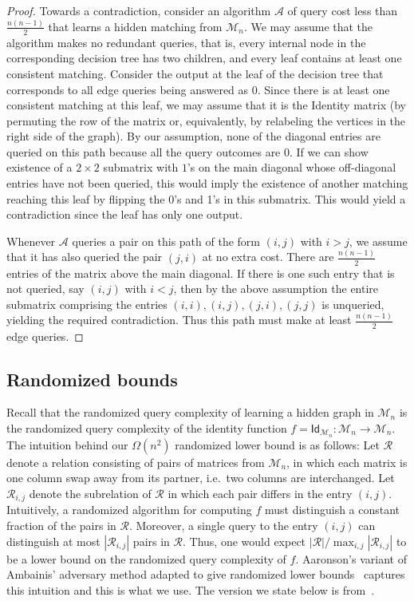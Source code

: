 \documentclass[11pt]{article}
\newcommand{\cA}{\mathcal{A}}
\newcommand{\cM}{\mathcal{M}}
\newcommand{\cR}{\mathcal{R}}
\begin{document}
\begin{proof}
    Towards a contradiction, consider an algorithm $\cA$ of query cost less than $\frac{n(n-1)}{2}$ that learns a hidden matching from $\cM_n$. We may assume that the algorithm makes no redundant queries, that is, every internal node in the corresponding decision tree has two children, and every leaf contains at least one consistent matching. Consider the output at the leaf of the decision tree that corresponds to all edge queries being answered as 0. Since there is at least one consistent matching at this leaf, we may assume that it is the Identity matrix (by permuting the row of the matrix or, equivalently, by relabeling the vertices in the right side of the graph). By our assumption, none of the diagonal entries are queried on this path because all the query outcomes are 0. If we can show existence of a $2\times2$ submatrix with $1$'s on the main diagonal whose off-diagonal entries have not been queried, this would imply the existence of another matching reaching this leaf by flipping the 0's and 1's in this submatrix. This would yield a contradiction since the leaf has only one output.

    Whenever $\cA$ queries a pair on this path of the form $(i, j)$ with $i > j$, we assume that it has also queried the pair $(j, i)$ at no extra cost. There are $\frac{n(n-1)}{2}$ entries of the matrix above the main diagonal. If there is one such entry that is not queried, say $(i, j)$ with $i < j$, then by the above assumption the entire submatrix comprising the entries $(i, i), (i, j), (j, i), (j, j)$ is unqueried, yielding the required contradiction. Thus this path must make at least $\frac{n(n-1)}{2}$ edge queries.
\end{proof}


\subsection{Randomized bounds}
Recall that the randomized query complexity of learning a hidden graph in $\cM_n$ is the randomized query complexity of the identity function $f = \mathsf{Id}_{\cM_n} : \cM_n \to \cM_n$.
The intuition behind our $\Omega(n^2)$ randomized lower bound is as follows: 
Let $\cR$ denote a relation consisting of pairs of matrices from $\cM_n$, in which each matrix is one column swap away from its partner, i.e.~two columns are interchanged. Let $\cR_{i, j}$ denote the subrelation of $\cR$ in which each pair differs in the entry $(i, j)$.
Intuitively, a randomized algorithm for computing $f$ must distinguish a constant fraction of the pairs in $\cR$. Moreover, a single query to the entry $(i,j)$ can distinguish at most $|\cR_{i, j}|$ pairs in $\cR$. Thus, one would expect $|\cR|/\max_{i, j}|\cR_{i,j}|$ to be a lower bound on the randomized query complexity of $f$.
Aaronson's variant of Ambainis' adversary method adapted to give randomized lower bounds~\cite[Theorem~5]{Aar04} captures this intuition and this is what we use. The version we state below is from~\cite[Section~3]{AKPVZ21}.
\end{document}
